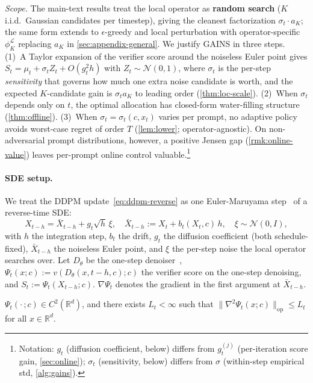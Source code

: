\emph{Scope.} The main-text results treat the local operator as \textbf{random search} ($K$ i.i.d.\ Gaussian candidates per timestep), giving the cleanest factorization $\sigma_t \cdot a_K$; the same form extends to $\epsilon$-greedy and local perturbation with operator-specific $\phi_K^{\mathcal L}$ replacing $a_K$ in \cref{sec:appendix-general}. We justify \textsc{GAINS} in three steps.
(1)~A Taylor expansion of the verifier score around the noiseless Euler point gives $S_t = \mu_t + \sigma_t Z_t + O(g_t^2 h)$ with $Z_t \sim \mathcal N(0,1)$, where $\sigma_t$ is the per-step \emph{sensitivity} that governs how much one extra noise candidate is worth, and the expected $K$-candidate gain is $\sigma_t a_K$ to leading order (\cref{thm:loc-scale}).
(2)~When $\sigma_t$ depends only on $t$, the optimal allocation has closed-form water-filling structure (\cref{thm:offline}).
(3)~When $\sigma_t = \sigma_t(c, x_t)$ varies per prompt, no adaptive policy avoids worst-case regret of order $T$ (\cref{lem:lower}; operator-agnostic). On non-adversarial prompt distributions, however, a positive Jensen gap (\cref{rmk:online-value}) leaves per-prompt online control valuable.\footnote{Notation: $g_t$ (diffusion coefficient, below) differs from $g_t^{(j)}$ (per-iteration score gain, \cref{sec:online}); $\sigma_t$ (sensitivity, below) differs from $\sigma$ (within-step empirical std, \cref{alg:gains}).}

\paragraph{SDE setup.}
We treat the DDPM update~\cref{eq:ddpm-reverse} as one Euler-Maruyama step~\citep{song2021scorebased} of a reverse-time SDE:
\begin{equation}
  X_{t-h} = \bar X_{t-h} + g_t\sqrt h\,\xi,\quad \bar X_{t-h} := X_t + b_t(X_t,c)\,h,\quad \xi\sim\mathcal N(0,I),
  \label{eq:em-step}
\end{equation}
with $h$ the integration step, $b_t$ the drift, $g_t$ the diffusion coefficient (both schedule-fixed), $\bar X_{t-h}$ the noiseless Euler point, and $\xi$ the per-step noise the local operator searches over. Let $D_\theta$ be the one-step denoiser~\citep{song2021scorebased}, $\Psi_t(x;c) := v(D_\theta(x,t{-}h,c);c)$ the verifier score on the one-step denoising, and $S_t := \Psi_t(X_{t-h};c)$. $\nabla\Psi_t$ denotes the gradient in the first argument at $\bar X_{t-h}$.

\begin{assumption}
\label{asm:smooth}
$\Psi_t(\cdot\,;c)\in C^2(\mathbb{R}^d)$, and there exists $L_t<\infty$ such that $\|\nabla^2\Psi_t(x;c)\|_{\mathrm{op}}\le L_t$ for all $x \in \mathbb{R}^d$.
\end{assumption}

